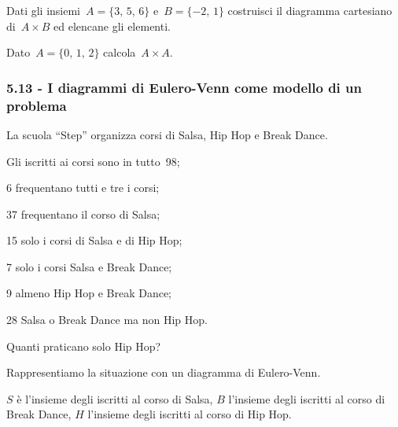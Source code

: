 \begin{esercizio}
 \label{ese:5.76}
Dati gli insiemi~$A=\{\text{3, 5, 6}\}$ e~$B=\{-2\text{, }1\}$ costruisci il
diagramma cartesiano di~$A\times B$ ed elencane gli elementi.
\end{esercizio}

\begin{esercizio}
 \label{ese:5.77}
 Dato~$A=\{\text{0, 1, 2}\}$ calcola~$A\times A$.
\end{esercizio}

\subsubsection*{5.13 - I diagrammi di Eulero-Venn come modello di un problema}

\begin{esercizio}[\Ast]
\label{ese:5.78}
La scuola ``Step'' organizza corsi di Salsa, Hip Hop e Break Dance.
\begin{multicols}{2}
\begin{enumeratea}
\item Gli iscritti ai corsi sono in tutto~98;
\item 6 frequentano tutti e tre i corsi;
\item 37 frequentano il corso di Salsa;
\item 15 solo i corsi di Salsa e di Hip Hop;
\item 7 solo i corsi Salsa e Break Dance;
\item 9 almeno Hip Hop e Break Dance;
\item 28 Salsa o Break Dance ma non Hip Hop.
\end{enumeratea}

Quanti praticano solo Hip Hop?

Rappresentiamo la situazione con un diagramma di Eulero-Venn.
\begin{center}
 
\end{center}
\end{multicols}
$S$ è l'insieme degli iscritti al corso di Salsa, $B$ l'insieme degli iscritti al corso di
Break Dance, $H$ l'insieme degli iscritti al corso di Hip Hop.
\end{esercizio}

